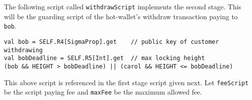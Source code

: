 \documentclass[runningheads]{llncs}
\begin{document}
The following script called \texttt{withdrawScript} implements the second stage. This will be the guarding script of the hot-wallet's withdraw transaction paying to \texttt{bob}.




\small{
\begin{verbatim}
val bob = SELF.R4[SigmaProp].get    // public key of customer withdrawing
val bobDeadline = SELF.R5[Int].get  // max locking height
(bob && HEIGHT > bobDeadline) || (carol && HEIGHT <= bobDeadline)
\end{verbatim}
}

This above script is referenced in the first stage script given next. Let \texttt{feeScript} be the script paying fee and \texttt{maxFee} be the maximum allowed fee. 
\end{document}
